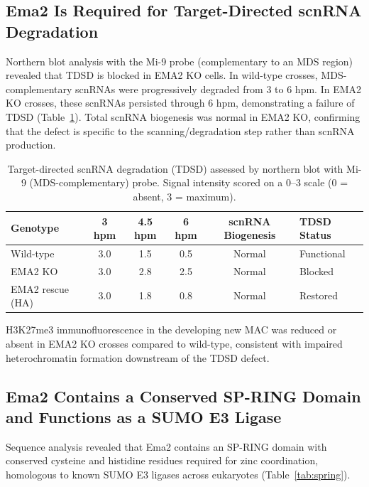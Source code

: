 \documentclass[11pt]{article}
\begin{document}
\subsection{Ema2 Is Required for Target-Directed scnRNA Degradation}

Northern blot analysis with the Mi-9 probe (complementary to an MDS region) revealed that TDSD is blocked in EMA2 KO cells. In wild-type crosses, MDS-complementary scnRNAs were progressively degraded from 3 to 6 hpm. In EMA2 KO crosses, these scnRNAs persisted through 6 hpm, demonstrating a failure of TDSD (Table~\ref{tab:tdsd}). Total scnRNA biogenesis was normal in EMA2 KO, confirming that the defect is specific to the scanning/degradation step rather than scnRNA production.

\begin{table}[H]
\centering
\caption{Target-directed scnRNA degradation (TDSD) assessed by northern blot with Mi-9 (MDS-complementary) probe. Signal intensity scored on a 0--3 scale (0 = absent, 3 = maximum).}
\label{tab:tdsd}
\begin{tabular}{lccccl}
\toprule
\textbf{Genotype} & \textbf{3 hpm} & \textbf{4.5 hpm} & \textbf{6 hpm} & \textbf{scnRNA Biogenesis} & \textbf{TDSD Status} \\
\midrule
Wild-type & 3.0 & 1.5 & 0.5 & Normal & Functional \\
EMA2 KO & 3.0 & 2.8 & 2.5 & Normal & Blocked \\
EMA2 rescue (HA) & 3.0 & 1.8 & 0.8 & Normal & Restored \\
\bottomrule
\end{tabular}
\end{table}

H3K27me3 immunofluorescence in the developing new MAC was reduced or absent in EMA2 KO crosses compared to wild-type, consistent with impaired heterochromatin formation downstream of the TDSD defect.

\subsection{Ema2 Contains a Conserved SP-RING Domain and Functions as a SUMO E3 Ligase}

Sequence analysis revealed that Ema2 contains an SP-RING domain with conserved cysteine and histidine residues required for zinc coordination, homologous to known SUMO E3 ligases across eukaryotes (Table~\ref{tab:spring}).
\end{document}
